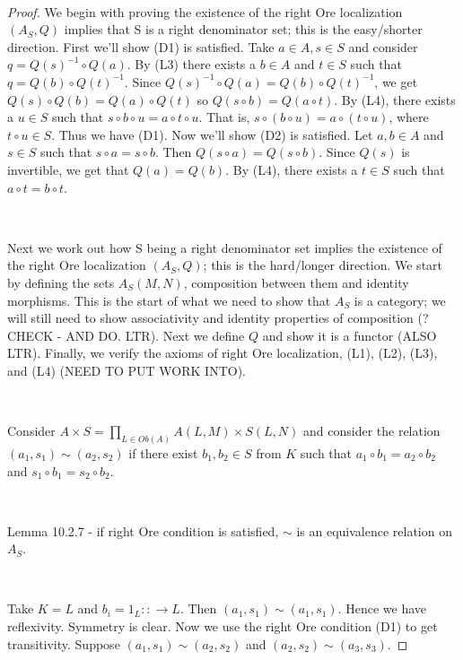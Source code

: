 \documentclass[12pt]{amsart}    %
\theoremstyle{definition}
\begin{document}
\

\begin{proof}

We begin with proving the existence of the right Ore localization $(A_S, Q)$ implies that S is a right denominator set; this is the easy/shorter direction.  First we'll show (D1) is satisfied.  Take $a \in A, s \in S$ and consider $q = Q(s)^{-1}\circ Q(a)$.  By (L3) there exists a $b \in A$ and $t \in S$ such that $q = Q(b) \circ Q(t)^{-1}$.  Since $Q(s)^{-1}\circ Q(a) = Q(b) \circ Q(t)^{-1}$, we get $Q(s) \circ Q(b) = Q(a) \circ Q(t)$ so $Q(s \circ b) = Q(a \circ t)$.  By (L4), there exists a $u \in S$ such that $s \circ b \circ u = a \circ t \circ u$.  That is, $s \circ (b \circ u) = a \circ (t \circ u)$, where $t \circ u \in S$.  Thus we have (D1).  Now we'll show (D2) is satisfied.  Let $a, b \in A$ and $s \in S$ such that $s \circ a = s \circ b$.  Then $Q(s\circ a) = Q(s \circ b)$.  Since $Q(s)$ is invertible, we get that $Q(a) = Q(b)$.  By (L4), there exists a $t \in S$ such that $a \circ t = b \circ t$.

\

Next we work out how S being a right denominator set implies the existence of the right Ore localization $(A_S, Q)$; this is the hard/longer direction.  We start by defining the sets $A_S(M,N)$, composition between them and identity morphisms.  This is the start of what we need to show that $A_S$ is a category; we will still need to show associativity and identity properties of composition (? CHECK - AND DO. LTR).  Next we define $Q$ and show it is a functor (ALSO LTR).  Finally, we verify the axioms of right Ore localization, (L1), (L2), (L3), and (L4) (NEED TO PUT WORK INTO).   

\

Consider $A \times S = \prod _{L \in Ob(A)} A(L,M) \times S(L,N)$ and consider the relation $(a_1, s_1) \sim (a_2, s_2)$ if there exist $b_1, b_2 \in S$ from $K$ such that $a_1 \circ b_1 = a_2 \circ b_2$ and $s_1 \circ b_1 = s_2 \circ b_2$.  

\

Lemma 10.2.7 - if right Ore condition is satisfied, $\sim$ is an equivalence relation on $A_S$.

\

Take $K = L$ and $b_i = 1_L: : \rightarrow L$.  Then $(a_1, s_1) \sim (a_1,s_1)$.  Hence we have reflexivity.  Symmetry is clear.  Now we use the right Ore condition (D1) to get transitivity.  Suppose $(a_1, s_1) \sim (a_2, s_2)$ and $(a_2, s_2) \sim (a_3, s_3)$.


\end{proof}
\end{document}
